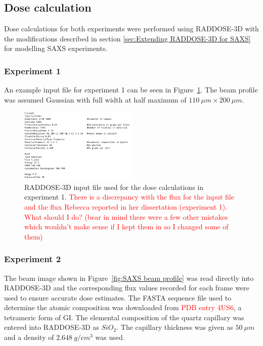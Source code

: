 \subsection{Dose calculation}
\label{sub:Dose calculation}
Dose calculations for both experiments were performed using RADDOSE-3D with the modifications described in section \ref{sec:Extending RADDOSE-3D for SAXS} for modelling SAXS experiments.

\subsubsection{Experiment 1}
\label{subs:Experiment 1 - dose calc}
An example input file for experiment 1 can be seen in Figure~\ref{fig:SAXS example input - Rebecca}. The beam profile was assumed Gaussian with full width at half maximum of $110\ \mu m \times 200\ \mu m$.
\begin{figure}
    \centering
    \includegraphics[width=0.5\textwidth]{figures/saxs/rebecca_raddose_input.png}
    \caption{RADDOSE-3D input file used for the dose calculations in experiment 1. \textcolor{red}{There is a discrepancy with the flux for the input file and the flux Rebecca reported in her dissertation (experiment 1). What should I do? (bear in mind there were a few other mistakes which wouldn't make sense if I kept them in so I changed some of them)}
    }
    \label{fig:SAXS example input - Rebecca}
\end{figure}

\subsubsection{Experiment 2}
\label{subs:Experiment 2 - dose calc}
The beam image shown in Figure~\ref{fig:SAXS beam profile} was read directly into RADDOSE-3D and the corresponding flux values recorded for each frame were used to ensure accurate dose estimates.
The FASTA sequence file used to determine the atomic composition was downloaded from \textcolor{red}{PDB entry 4US6}, a tetrameric form of GI.
The elemental composition of the quartz capillary was entered into RADDOSE-3D as $SiO_2$.
The capillary thickness was given as $50\ \mu m$ and a density of $2.648\ g/cm^3$ was used.
